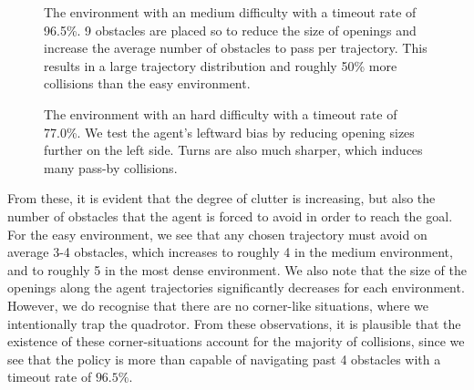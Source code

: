 \begin{figure}[!htbp]
    \centering
    \caption{The environment with an medium difficulty with a timeout rate of 96.5\%. 9 obstacles are placed so to reduce the size of openings and increase the average number of obstacles to pass per trajectory. This results in a large trajectory distribution and roughly 50\% more collisions than the easy environment.}
    \label{fig:7_medium}
    \caption{The environment with an hard difficulty with a timeout rate of 77.0\%. We test the agent's leftward bias by reducing opening sizes further on the left side. Turns are also much sharper, which induces many pass-by collisions.}    
    \label{fig:7_hard}
\end{figure}

From these, it is evident that the degree of clutter is increasing, but also the number of obstacles that the agent is forced to avoid in order to reach the goal. For the easy environment, we see that any chosen trajectory must avoid on average 3-4 obstacles, which increases to roughly 4 in the medium environment, and to roughly 5 in the most dense environment. We also note that the size of the openings along the agent trajectories significantly decreases for each environment.
However, we do recognise that there are no corner-like situations, where we intentionally trap the quadrotor.
From these observations, it is plausible that the existence of these corner-situations account for the majority of collisions, since we see that the policy is more than capable of navigating past 4 obstacles with a timeout rate of $96.5\%$.

